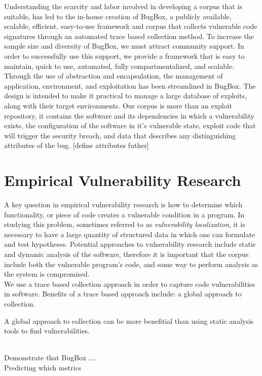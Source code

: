 \documentclass[letterpaper,twocolumn,10pt]{article}
\begin{document}
Understanding the scarcity and labor involved in developing a corpus that is suitable, has led to the in-house creation of BugBox, a publicly available, scalable, efficient, easy-to-use framework and corpus that collects vulnerable code signatures through an automated trace based collection method.  To increase the sample size and diversity of BugBox, we must attract community support.  In order to successfully use this support, we provide a framework that is easy to maintain, quick to use, automated, fully compartmentalized, and scalable.  Through the use of abstraction and encapsulation, the management of application, environment, and exploitation has been streamlined in BugBox.  The design is intended to make it practical to manage a large database of exploits, along with their target environments. Our corpus is more than an exploit repository, it contains the software and its dependencies in which a vulnerability exists, the configuration of the software in it's vulnerable state, exploit code that will trigger the security breach, and data that describes any distinguishing attributes of the bug. [define attributes futher]\\



\section{Empirical Vulnerability Research}

A key question in empirical vulnerability research is how to determine which functionality, or piece of code creates a vulnerable condition in a program. In studying this problem, sometimes referred to as \emph{vulnerability localization}, it is necessary to have a large quantity of structured data in which one can formulate and test hypotheses. Potential approaches to vulnerability research include static and dynamic analysis of the software, therefore it is important that the corpus include both the vulnerable program's code, and some way to perform analysis as the system is compromised.\\

We use a trace based collection approach in order to capture code vulnerabilities in software.  Benefits of a trace based approach include:  a global approach to collection.

A global approach to collection can be more benefitial than using static analysis tools to find vulnerabilities.   

 \\
Demonstrate that BugBox ....\\
Predicting which metrics  \\
\end{document}
